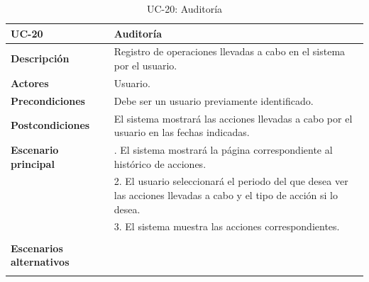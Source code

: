\begin{table}
  \begin{center}
    \begin{tabularx}{16.4cm}{|l|X|}
      \hline
      \textbf{UC-20} & \textbf{Auditoría}\\
      \hline
      \textbf{Descripción} & Registro de operaciones llevadas a cabo en el sistema por el usuario.\\
      \hline
      \textbf{Actores} & Usuario.\\
      \hline
      \textbf{Precondiciones} & Debe ser un usuario previamente identificado.\\
      \hline
      \textbf{Postcondiciones} & El sistema mostrará las acciones llevadas a cabo por el usuario en las fechas indicadas.\\
      \hline
      \textbf{Escenario principal} & \smallskip 1. El sistema mostrará la página correspondiente al histórico de acciones.\\
      & 2. El usuario seleccionará el periodo del que desea ver las acciones llevadas a cabo y el tipo de acción si lo desea.\\
      & 3. El sistema muestra las acciones correspondientes.\\
      & \\
      \hline
      \textbf{Escenarios alternativos} & \\
      & \\
      \hline
    \end{tabularx}
    \caption{UC-20: Auditoría}
    \label{tab:CU-auditorias}
  \end{center}
\end{table}



